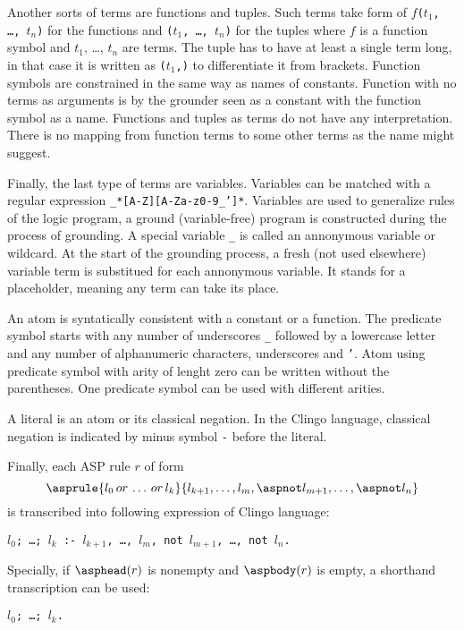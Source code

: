 Another sorts of terms are functions and tuples.
Such terms take form of \texttt{$f$($t_1$, \ldots, $t_n$)} for the functions
and \texttt{($t_1$, \ldots, $t_n$)} for the tuples where $f$ is a function symbol
and $t_1$, \ldots, $t_n$ are terms. The tuple has to have at least a single term long,
in that case it is written as \texttt{($t_1$,)} to differentiate it from brackets.
Function symbols are constrained in the same way as names of constants.
Function with no terms as arguments is by the grounder seen as a constant with the function
symbol as a name.
Functions and tuples as terms do not have any interpretation.
There is no mapping from function terms to some other terms as the name might suggest.

Finally, the last type of terms are variables.
Variables can be matched with a regular expression \texttt{\_*[A-Z][A-Za-z0-9\_']*}.  %
Variables are used to generalize rules of the logic program,
a ground (variable-free) program is constructed during the process of grounding.
A special variable \texttt{\_} is called an annonymous variable or wildcard.
At the start of the grounding process, a fresh (not used elsewhere) variable term
is substitued for each annonymous variable.
It stands for a placeholder, meaning any term can take its place.

An atom is syntatically consistent with a constant or a function.
The predicate symbol starts with any number of underscores \texttt{\_}
followed by a lowercase letter and any number of alphanumeric characters,
underscores and \texttt{'}.
Atom using predicate symbol with arity of lenght zero can be written without the parentheses.
One predicate symbol can be used with different arities.

A literal is an atom or its classical negation.
In the Clingo language, classical negation is indicated by minus symbol \texttt{-}  %
before the literal.

Finally, each ASP rule $r$ of form
\[\asprule{l_0\, or\, \ldots\, or\, l_k}{l_{k+1}, \ldots, l_{m}, \aspnot l_{m+1}, \ldots, \aspnot l_{n}}\]
is transcribed into following expression of Clingo language:
\begin{center}
    \texttt{$l_0$; \ldots; $l_k$ :- $l_{k+1}$, \ldots, $l_{m}$, not $l_{m+1}$, \ldots, not $l_{n}$.}  %
\end{center}
Specially, if $\asphead(r)$ is nonempty and $\aspbody(r)$ is empty, a shorthand transcription
can be used:
\begin{center}
    \texttt{$l_0$; \ldots; $l_k$.}  %
\end{center}

